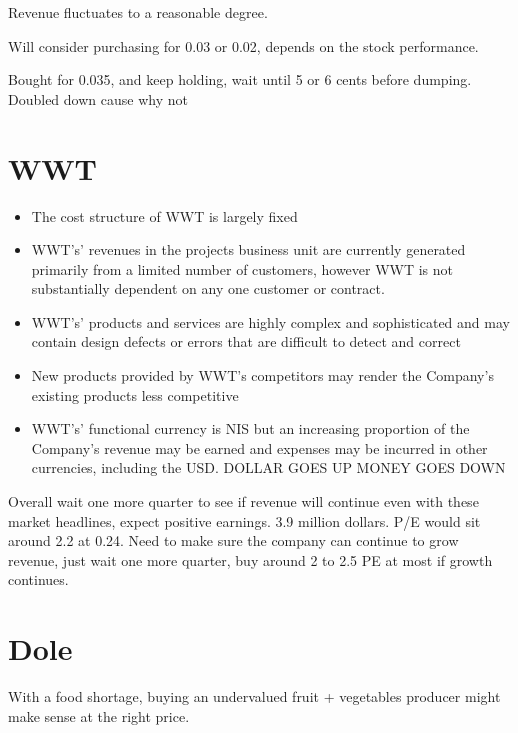 Revenue fluctuates to a reasonable degree.

Will consider purchasing for 0.03 or 0.02, depends on the stock performance.

Bought for 0.035, and keep holding, wait until 5 or 6 cents before dumping. Doubled down cause why not

\section{WWT}
\begin{itemize}
    \item The cost structure of WWT is largely fixed
    \item WWT’s' revenues in the projects business unit are currently generated primarily from a limited number of
customers, however WWT is not substantially dependent on any one customer or contract.
\item WWT’s' products and services are highly complex and sophisticated and may contain design defects or errors
that are difficult to detect and correct
\item New products provided by WWT’s competitors may render the Company's existing products less
competitive
\item WWT’s' functional currency is NIS but an increasing proportion of the Company's revenue may be earned
and expenses may be incurred in other currencies, including the USD. DOLLAR GOES UP MONEY GOES DOWN
\end{itemize}

Overall wait one more quarter to see if revenue will continue even with these market headlines, expect positive earnings. 3.9 million dollars. P/E would sit around 2.2 at 0.24. Need to make sure the company can continue to grow revenue, just wait one more quarter, buy around 2 to 2.5 PE at most if growth continues.

\section{Dole}

With a food shortage, buying an undervalued fruit + vegetables producer might make sense at the right price.

